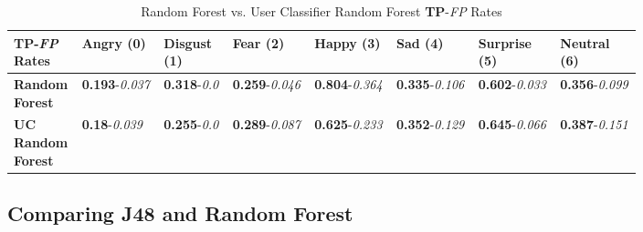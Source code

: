 \FloatBarrier
\begin{table}[htb!]
\begin{center}
 \begin{tabular}{||P{0.105\linewidth}|P{0.1\linewidth}|P{0.1\linewidth}|P{0.1\linewidth}|P{0.1\linewidth}|P{0.1\linewidth}|P{0.1\linewidth}|P{0.1\linewidth}||} 
 \hline
 \textbf{TP}-\textit{FP} Rates 
 & \textbf{Angry (0)} 
 & \textbf{Disgust (1)} 
 & \textbf{Fear (2)} 
 & \textbf{Happy (3)} 
 & \textbf{Sad (4)} 
 & \textbf{Surprise (5)} 
 & \textbf{Neutral (6)} 
 
 \\ \hline\hline
 
 \textbf{Random Forest} 
 & \textbf{0.193}-\textit{0.037} 
 & \textbf{0.318}-\textit{0.0} 
 & \textbf{0.259}-\textit{0.046} 
 & \textbf{0.804}-\textit{0.364} 
 & \textbf{0.335}-\textit{0.106} 
 & \textbf{0.602}-\textit{0.033} 
 & \textbf{0.356}-\textit{0.099}
 
 \\  \hline
 
 \textbf{UC Random Forest} 
 & \textbf{0.18}-\textit{0.039} 
 & \textbf{0.255}-\textit{0.0} 
 & \textbf{0.289}-\textit{0.087} 
 & \textbf{0.625}-\textit{0.233} 
 & \textbf{0.352}-\textit{0.129} 
 & \textbf{0.645}-\textit{0.066} 
 & \textbf{0.387}-\textit{0.151}
 
 \\ \hline
 
 \hline
\end{tabular}
\caption{Random Forest vs. User Classifier Random Forest \textbf{TP}-\textit{FP} Rates}
\label{table:uc:randForest_vs_UCrandForest_tpfp}
\end{center}
\end{table}






\FloatBarrier
\subsection{Comparing J48 and Random Forest}
